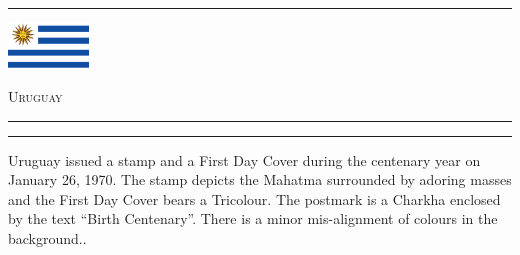 \documentclass[a4paper]{article}
\begin{document}
\hrule
\vspace{8pt}
\begin{minipage}{2cm}
  \includegraphics[height=1.2cm]{images/uy}
\end{minipage}
\hfill
{\scshape\huge Uruguay}
\vspace{8pt}
\hrule
\vspace{12cm}
\hfill
\begin{minipage}{6cm} \hrule \vspace{12pt} Uruguay issued a stamp and
  a First Day Cover during the centenary year on January 26, 1970. The
  stamp depicts the Mahatma surrounded by adoring masses and the First
  Day Cover bears a Tricolour. The postmark is a Charkha enclosed by
  the text ``Birth Centenary''. There is a minor mis-alignment of
  colours in the background..
\end{minipage}
\end{document}
